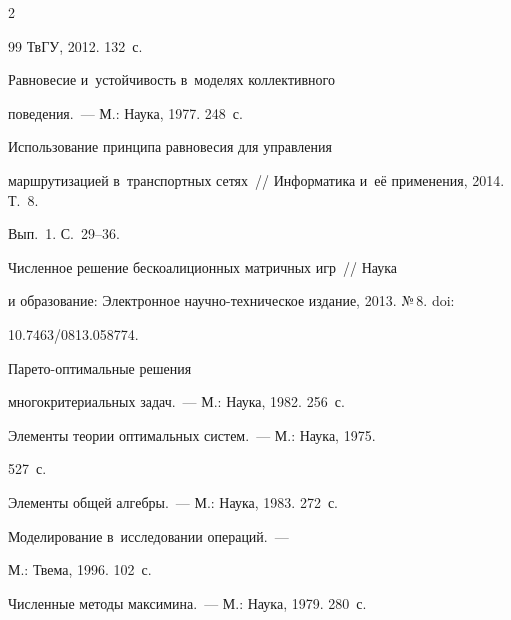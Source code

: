 \begin{multicols}{2}
{{\begin{thebibliography}{99}
ТвГУ, 2012. 132~с.


 Равновесие и~устойчивость в~моделях коллективного

поведения.~--- М.: Наука, 1977. 248~с.


 Использование принципа равновесия для управления

маршрутизацией в~транспортных сетях~// Информатика и~её применения, 2014. Т.~8.

Вып.~1. С.~29--36.


 Численное решение бескоалиционных матричных игр~// Наука

и образование: Электронное на\-уч\-но-тех\-ни\-че\-ское издание, 2013. №\,8. doi:

10.7463/0813.058774.


 Па\-ре\-то-оп\-ти\-маль\-ные решения

многокритериальных задач.~--- М.: Наука, 1982. 256~с.


 Элементы теории оптимальных сис\-тем.~--- М.: Наука, 1975.

527~с.


 Элементы общей алгебры.~--- М.: Наука, 1983. 272~с.


 Моделирование в~исследовании операций.~---

М.: Твема, 1996. 102~с.


 Численные методы максимина.~--- М.: Наука, 1979. 280~с.

 \end{thebibliography}



 }

 }



\end{multicols}



\vspace*{-3pt}



